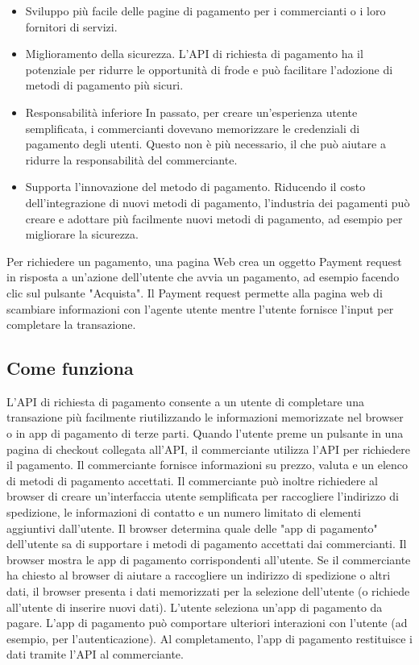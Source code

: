 \documentclass[italian]{article}
\begin{document}
\begin{itemize}
	\item Sviluppo più facile delle pagine di pagamento per i commercianti o i loro fornitori di servizi.
	\item Miglioramento della sicurezza. L'API di richiesta di pagamento ha il potenziale per ridurre le opportunità di frode e può facilitare l'adozione di metodi di pagamento più sicuri.
	\item Responsabilità inferiore In passato, per creare un'esperienza utente semplificata, i commercianti dovevano memorizzare le credenziali di pagamento degli utenti. Questo non è più necessario, il che può aiutare a ridurre la responsabilità del commerciante.
	\item Supporta l'innovazione del metodo di pagamento. Riducendo il costo dell'integrazione di nuovi metodi di pagamento, l'industria dei pagamenti può creare e adottare più facilmente nuovi metodi di pagamento, ad esempio per migliorare la sicurezza.
	\end{itemize}
	
	\begin{flushleft}
		Per richiedere un pagamento, una pagina Web crea un oggetto Payment request in risposta a un'azione dell'utente che avvia un pagamento, ad esempio facendo clic sul pulsante "Acquista". 
		Il Payment request permette alla pagina web di scambiare informazioni con l'agente utente mentre l'utente fornisce l'input per completare la transazione.
	\end{flushleft}

	\subsection{Come funziona}
	L'API di richiesta di pagamento consente a un utente di completare una transazione più facilmente riutilizzando le informazioni memorizzate nel browser o in app di pagamento di terze parti.
	Quando l'utente preme un pulsante in una pagina di checkout collegata all'API, il commerciante utilizza l'API per richiedere il pagamento. Il commerciante fornisce informazioni su prezzo, valuta e un elenco di metodi di pagamento accettati. Il commerciante può inoltre richiedere al browser di creare un'interfaccia utente semplificata per raccogliere l'indirizzo di spedizione, le informazioni di contatto e un numero limitato di elementi aggiuntivi dall'utente.
	Il browser determina quale delle "app di pagamento" dell'utente sa di supportare i metodi di pagamento accettati dai commercianti. Il browser mostra le app di pagamento corrispondenti all'utente. Se il commerciante ha chiesto al browser di aiutare a raccogliere un indirizzo di spedizione o altri dati, il browser presenta i dati memorizzati per la selezione dell'utente (o richiede all'utente di inserire nuovi dati).
	L'utente seleziona un'app di pagamento da pagare. L'app di pagamento può comportare ulteriori interazioni con l'utente (ad esempio, per l'autenticazione). Al completamento, l'app di pagamento restituisce i dati tramite l'API al commerciante.
\end{document}
